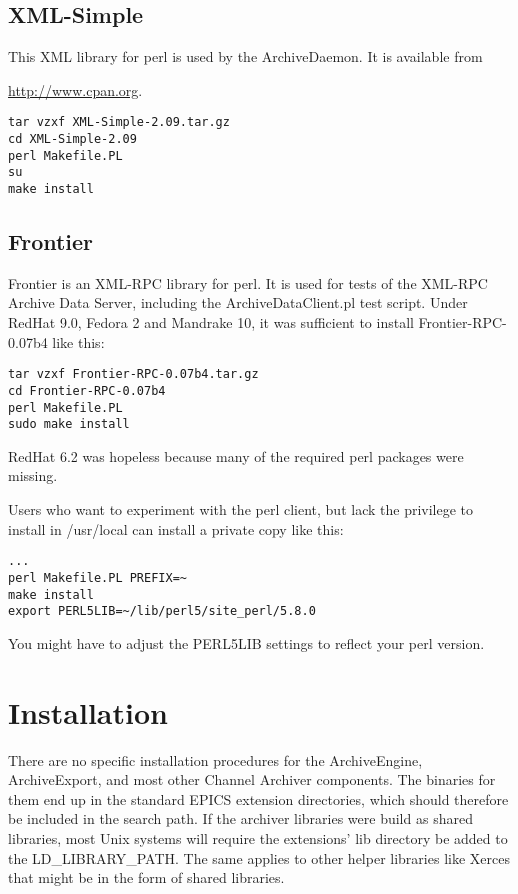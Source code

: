 \subsection{XML-Simple}
This XML library for perl is used by the ArchiveDaemon.
It is available from 
\begin{center}
\href{http://www.cpan.org}{http://www.cpan.org}.
\end{center}
\begin{lstlisting}[keywordstyle=\sffamily]
tar vzxf XML-Simple-2.09.tar.gz
cd XML-Simple-2.09
perl Makefile.PL
su
make install
\end{lstlisting}

\subsection{Frontier}
Frontier is an XML-RPC library for perl.
It is used for tests of the XML-RPC Archive Data Server,
including the ArchiveDataClient.pl test script.
Under RedHat 9.0, Fedora 2 and Mandrake 10, it was sufficient to install
Frontier-RPC-0.07b4 like this:
\begin{lstlisting}[keywordstyle=\sffamily]
tar vzxf Frontier-RPC-0.07b4.tar.gz
cd Frontier-RPC-0.07b4
perl Makefile.PL
sudo make install
\end{lstlisting}

\noindent RedHat 6.2 was hopeless because many of the required perl
packages were missing.

Users who want to experiment with the perl client, but lack the
privilege to install in /usr/local can install a private copy like
this:
\begin{lstlisting}[keywordstyle=\sffamily]
...
perl Makefile.PL PREFIX=~
make install
export PERL5LIB=~/lib/perl5/site_perl/5.8.0
\end{lstlisting}
\noindent You might have to adjust the PERL5LIB settings to reflect
your perl version.

\section{Installation}
There are no specific installation procedures for the ArchiveEngine,
ArchiveExport, and most other Channel Archiver components. The
binaries for them end up in the standard EPICS extension directories,
which should therefore be included in the search path. If the archiver
libraries were build as shared libraries, most Unix systems will
require the extensions' lib directory be added to the
LD\_LIBRARY\_PATH. The same applies to other helper libraries like
Xerces that might be in the form of shared libraries.

